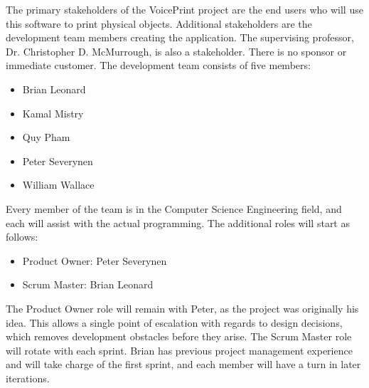 The primary stakeholders of the VoicePrint project are the end users who will use this software to print physical objects. Additional stakeholders are the development team members creating the application. The supervising professor, Dr. Christopher D. McMurrough, is also a stakeholder. There is no sponsor or immediate customer. The development team consists of five members:
\begin{itemize}
    \item Brian Leonard
    \item Kamal Mistry
    \item Quy Pham
    \item Peter Severynen
    \item William Wallace
\end{itemize}
Every member of the team is in the Computer Science Engineering field, and each will assist with the actual programming. The additional roles will start as follows:
\begin{itemize}
  \item Product Owner: Peter Severynen
  \item Scrum Master: Brian Leonard
\end{itemize}
The Product Owner role will remain with Peter, as the project was originally his idea. This allows a single point of escalation with regards to design decisions, which removes development obstacles before they arise.
The Scrum Master role will rotate with each sprint. Brian has previous project management experience and will take charge of the first sprint, and each member will have a turn in later iterations.